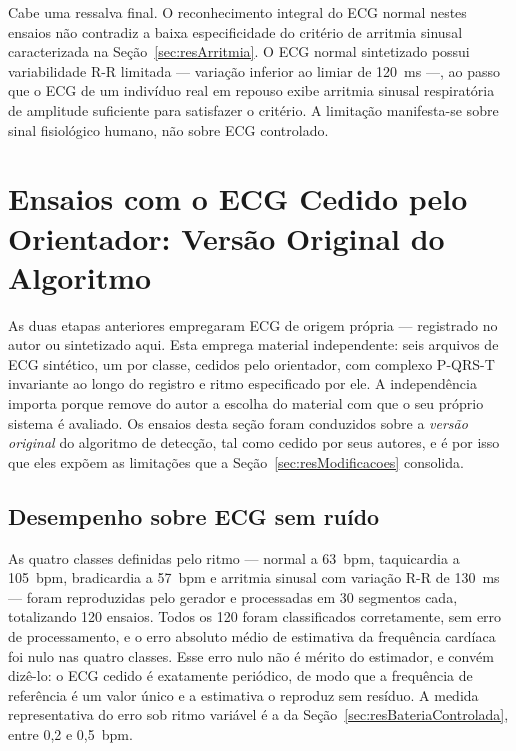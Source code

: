 Cabe uma ressalva final. O reconhecimento integral do \acs{ECG} normal nestes ensaios não
contradiz a baixa especificidade do critério de arritmia sinusal caracterizada na
Seção~\ref{sec:resArritmia}. O \acs{ECG} normal sintetizado possui variabilidade R-R
limitada --- variação inferior ao limiar de 120~ms ---, ao passo que o \acs{ECG} de um
indivíduo real em repouso exibe arritmia sinusal respiratória de amplitude suficiente para
satisfazer o critério. A limitação manifesta-se sobre sinal fisiológico humano, não sobre
\acs{ECG} controlado.

\section{Ensaios com o ECG Cedido pelo Orientador: Versão Original do Algoritmo}
\label{sec:resEcgOrientadorOriginal}

As duas etapas anteriores empregaram \acs{ECG} de origem própria --- registrado no autor ou
sintetizado aqui. Esta emprega material independente: seis arquivos de \acs{ECG} sintético,
um por classe, cedidos pelo orientador, com complexo P-QRS-T invariante ao longo do registro
e ritmo especificado por ele. A independência importa porque remove do autor a escolha do
material com que o seu próprio sistema é avaliado. Os ensaios desta seção foram conduzidos
sobre a \emph{versão original} do algoritmo de detecção, tal como cedido por seus autores,
e é por isso que eles expõem as limitações que a Seção~\ref{sec:resModificacoes} consolida.

\subsection{Desempenho sobre ECG sem ruído}
\label{sec:resOrigLimpo}

As quatro classes definidas pelo ritmo --- normal a 63~bpm, taquicardia a 105~bpm,
bradicardia a 57~bpm e arritmia sinusal com variação R-R de 130~ms --- foram reproduzidas
pelo gerador e processadas em 30 segmentos cada, totalizando 120 ensaios. Todos os 120 foram
classificados corretamente, sem erro de processamento, e o erro absoluto médio de estimativa
da frequência cardíaca foi nulo nas quatro classes. Esse erro nulo não é mérito do
estimador, e convém dizê-lo: o \acs{ECG} cedido é exatamente periódico, de modo que a
frequência de referência é um valor único e a estimativa o reproduz sem resíduo. A medida
representativa do erro sob ritmo variável é a da Seção~\ref{sec:resBateriaControlada}, entre
0,2 e 0,5~bpm.


